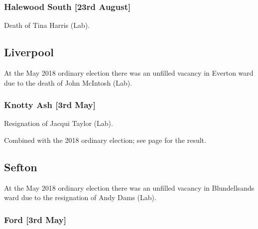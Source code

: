 \documentclass[a4paper,openany]{book}
\begin{document}
\begin{resultsiii}
\subsubsection*{Halewood South \hspace*{\fill}\nolinebreak[1]%
\enspace\hspace*{\fill}
[23rd August]}


Death of Tina Harris (Lab).

\subsection*{Liverpool}

At the May 2018 ordinary election there was an unfilled vacancy in Everton ward due to the death of John McIntosh (Lab).

\subsubsection*{Knotty Ash \hspace*{\fill}\nolinebreak[1]%
\enspace\hspace*{\fill}
[3rd May]}


Resignation of Jacqui Taylor (Lab).

Combined with the 2018 ordinary election; see page \pageref{KnottyAshLiverpool} for the result.

\subsection*{Sefton}

At the May 2018 ordinary election there was an unfilled vacancy in Blundellsands ward due to the resignation of Andy Dams (Lab).

\subsubsection*{Ford \hspace*{\fill}\nolinebreak[1]%
\enspace\hspace*{\fill}
[3rd May]}



\end{resultsiii}
\end{document}
